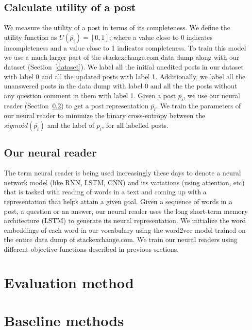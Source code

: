 \documentclass[11pt]{article}
\begin{document}
\subsection{Calculate utility of a post}\label{utility_calculator}

We measure the utility of a post in terms of its completeness. We define the utility function as $U(\bar{p_i}) = [0, 1]$; where a value close to 0 indicates incompleteness and a value close to 1 indicates completeness. To train this model we use a much larger part of the stackexchange.com data dump along with our dataset (Section~\ref{dataset}). We label all the initial unedited posts in our dataset with label 0 and all the updated posts with label 1. Additionally, we label all the unanswered posts in the data dump with label 0 and all the the posts without any question comment in them with label 1. Given a post $p_i$, we use our neural reader (Section~\ref{neural_readers}) to get a post representation $\bar{p_i}$. We train the parameters of our neural reader to minimize the binary cross-entropy between the $sigmoid(\bar{p_i})$ and the label of $p_i$, for all labelled posts. 

\subsection{Our neural reader}\label{neural_readers}

The term neural reader is being used increasingly these days to denote a neural network model (like RNN, LSTM, CNN) and its variations (using attention, etc) that is tasked with reading of words in a text and coming up with a representation that helps attain a given goal. Given a sequence of words in a post, a question or an answer, our neural reader uses the long short-term memory architecture (LSTM) \cite{hochreiter1997long} to generate its neural representation. We initialize the word embeddings of each word in our vocabulary using the word2vec \cite{mikolov2013efficient} model trained on the entire data dump of stackexchange.com. We train our neural readers using different objective functions described in previous sections. 

\section{Evaluation method}

\section{Baseline methods}
\end{document}
